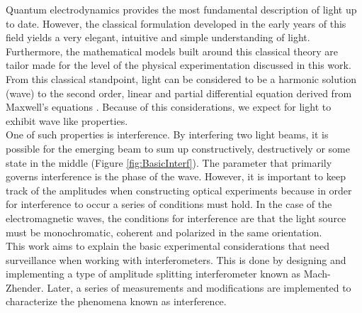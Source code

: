 \label{sec:INTRO}
Quantum electrodynamics provides the most fundamental description of light up to date. 
However, the classical formulation developed in the early years of this field yields a very elegant, intuitive and simple understanding of light. 
Furthermore, the mathematical models built around this classical theory are tailor made for the level of the physical experimentation discussed in this work. 
From this classical standpoint, light can be considered to be a harmonic solution (wave) to the second order, linear and partial differential equation derived 
from Maxwell's equations \cite{maxwell1954electricity}. Because of this considerations, we expect for light to exhibit wave like properties. \\

One of such properties is interference. By interfering two light beams, it is possible for the emerging beam to sum up constructively, destructively or some state in the middle (Figure \ref{fig:BasicInterf}). The parameter that primarily governs interference is the phase of the wave. However, it is important to keep track of the amplitudes when constructing optical experiments because in order for interference to occur a series of conditions must hold.  In the case of the electromagnetic waves, the conditions for interference are that the light source must be monochromatic, coherent and polarized in the same orientation. \\

This work aims to explain the basic experimental considerations that need surveillance when working with interferometers. This is done by designing and implementing a type of amplitude splitting interferometer known as Mach-Zhender. Later, a series of measurements and modifications are implemented to characterize the phenomena known as interference.




